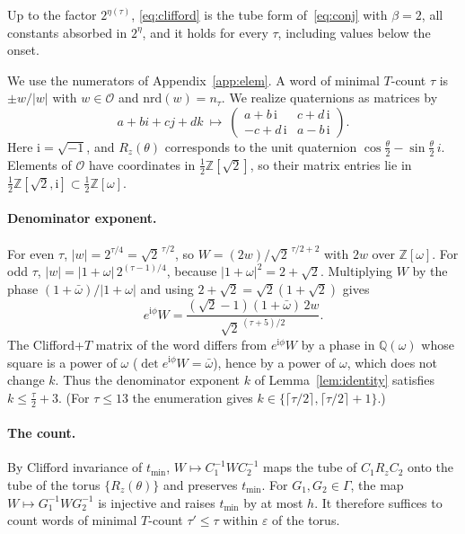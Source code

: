 \documentclass[aps,prx,twocolumn,superscriptaddress,nofootinbib,longbibliography]{revtex4-2}
\theoremstyle{plain}
\theoremstyle{definition}
\theoremstyle{remark}
\newcommand{\Z}{\mathbb{Z}}
\newcommand{\Q}{\mathbb{Q}}
\begin{document}
Up to the factor $2^{\eta(\tau)}$, \eqref{eq:clifford} is the tube form of~\eqref{eq:conj} with $\beta=2$, all constants absorbed in $2^\eta$, and it holds for every $\tau$, including values below the onset.

We use the numerators of Appendix~\ref{app:elem}. A word of minimal $T$-count $\tau$ is $\pm w/|w|$ with $w\in\mathcal O$ and $\mathrm{nrd}(w)=n_\tau$. We realize quaternions as matrices by
\[
a+bi+cj+dk\ \mapsto\ \begin{pmatrix}a+b\,\mathrm i&c+d\,\mathrm i\\-c+d\,\mathrm i&a-b\,\mathrm i\end{pmatrix}.
\]
Here $\mathrm i=\sqrt{-1}$, and $R_z(\theta)$ corresponds to the unit quaternion $\cos\tfrac\theta2-\sin\tfrac\theta2\,i$. Elements of $\mathcal O$ have coordinates in $\tfrac12\Z[\sqrt2]$, so their matrix entries lie in $\tfrac12\Z[\sqrt2,\mathrm i]\subset\tfrac12\Z[\omega]$.

\paragraph{Denominator exponent.} For even $\tau$, $|w|=2^{\tau/4}=\sqrt2^{\,\tau/2}$, so $W=(2w)/\sqrt2^{\,\tau/2+2}$ with $2w$ over $\Z[\omega]$. For odd $\tau$, $|w|=|1+\omega|\,2^{(\tau-1)/4}$, because $|1+\omega|^2=2+\sqrt2$. Multiplying $W$ by the phase $(1+\bar\omega)/|1+\omega|$ and using $2+\sqrt2=\sqrt2(1+\sqrt2)$ gives
\[
e^{\mathrm i\phi}W=\frac{(\sqrt2-1)(1+\bar\omega)\,2w}{\sqrt2^{\,(\tau+5)/2}} .
\]
The Clifford+$T$ matrix of the word differs from $e^{\mathrm i\phi}W$ by a phase in $\Q(\omega)$ whose square is a power of $\omega$ ($\det e^{\mathrm i\phi}W=\bar\omega$), hence by a power of $\omega$, which does not change $k$. Thus the denominator exponent $k$ of Lemma~\ref{lem:identity} satisfies $k\le\tfrac\tau2+3$. (For $\tau\le13$ the enumeration gives $k\in\{\lceil\tau/2\rceil,\lceil\tau/2\rceil+1\}$.)

\paragraph{The count.} By Clifford invariance of $t_{\min}$, $W\mapsto C_1^{-1}WC_2^{-1}$ maps the tube of $C_1R_zC_2$ onto the tube of the torus $\{R_z(\theta)\}$ and preserves $t_{\min}$. For $G_1,G_2\in\Gamma$, the map $W\mapsto G_1^{-1}WG_2^{-1}$ is injective and raises $t_{\min}$ by at most $h$. It therefore suffices to count words of minimal $T$-count $\tau'\le\tau$ within $\varepsilon$ of the torus.
\end{document}
